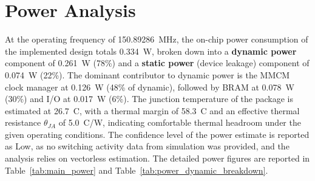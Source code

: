 \documentclass[11pt]{article}
\begin{document}
\section*{Power Analysis}

At the operating frequency of 150.89286~MHz, the on-chip power consumption of the implemented design totals 0.334~W, broken down into a \textbf{dynamic power} component of 0.261~W (78\%) and a \textbf{static power} (device leakage) component of 0.074~W (22\%). The dominant contributor to dynamic power is the MMCM clock manager at 0.126~W (48\% of dynamic), followed by BRAM at 0.078~W (30\%) and I/O at 0.017~W (6\%). The junction temperature of the package is estimated at 26.7~\textdegree C, with a thermal margin of 58.3~\textdegree C and an effective thermal resistance $\theta_{JA}$ of 5.0~\textdegree C/W, indicating comfortable thermal headroom under the given operating conditions. The confidence level of the power estimate is reported as Low, as no switching activity data from simulation was provided, and the analysis relies on vectorless estimation. The detailed power figures are reported in Table~\ref{tab:main_power} and Table~\ref{tab:power_dynamic_breakdown}.
\end{document}

